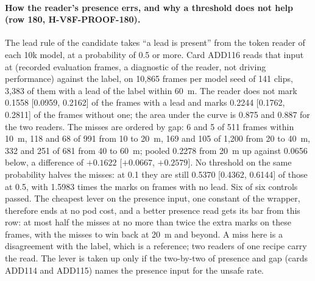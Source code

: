 \paragraph{How the reader's presence errs, and why a threshold does not help (row 180, H-V8F-PROOF-180).} The lead rule of the candidate takes ``a lead is present'' from the token reader of each 10k model, at a probability of 0.5 or more. Card ADD116 reads that input at  (recorded evaluation frames, a diagnostic of the reader, not driving performance) against the label, on 10,865 frames per model seed of 141 clips, 3,383 of them with a lead of the label within 60~m. The reader does not mark 0.1558 [0.0959, 0.2162] of the frames with a lead and marks 0.2244 [0.1762, 0.2811] of the frames without one; the area under the curve is 0.875 and 0.887 for the two readers. The misses are ordered by gap: 6 and 5 of 511 frames within 10~m, 118 and 68 of 991 from 10 to 20~m, 169 and 105 of 1,200 from 20 to 40~m, 332 and 251 of 681 from 40 to 60~m; pooled 0.2278 from 20~m up against 0.0656 below, a difference of $+0.1622$ [$+0.0667$, $+0.2579$]. No threshold on the same probability halves the misses: at 0.1 they are still 0.5370 [0.4362, 0.6144] of those at 0.5, with 1.5983 times the marks on frames with no lead. Six of six controls passed. The cheapest lever on the presence input, one constant of the wrapper, therefore ends at no pod cost, and a better presence read gets its bar from this row: at most half the misses at no more than twice the extra marks on these frames, with the misses to win back at 20~m and beyond. A miss here is a disagreement with the label, which is a reference; two readers of one recipe carry the read. The lever is taken up only if the two-by-two of presence and gap (cards ADD114 and ADD115) names the presence input for the unsafe rate.

